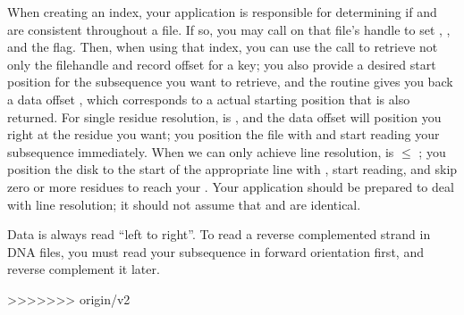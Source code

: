 When creating an index, your application is responsible for
determining if  and  are consistent throughout a
file. If so, you may call  on that
file's handle to set , , and the
 flag. Then, when using that index, you can
use the  call to retrieve not only the
filehandle  and record offset  for a key; you
also provide a desired start position  for the
subsequence you want to retrieve, and the routine gives you back a
data offset , which corresponds to a actual starting
position  that is also returned. For single
residue resolution,  is ,
and the data offset  will position you right at the
residue you want; you position the file with  and
start reading your subsequence immediately. When we can only achieve
line resolution,  is $\leq$
; you position the disk to the start of the
appropriate line with , start reading, and skip zero
or more residues to reach your . Your
application should be prepared to deal with line resolution; it should
not assume that  and  are
identical.

Data is always read ``left to right''.  To read a reverse complemented
strand in DNA files, you must read your subsequence in forward
orientation first, and reverse complement it later.



>>>>>>> origin/v2
